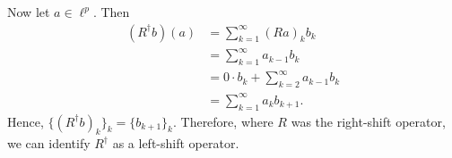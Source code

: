\documentclass{article}
\begin{document}
Now let $a\in\ell^p$. Then 
\begin{align}
	\left(R^{\dagger}b\right)(a) &= \sum_{k=1}^{\infty}\left(Ra\right)_k b_k \\
	&= \sum_{k=1}^{\infty} a_{k-1}b_k \\
	&= 0\cdot b_k + \sum_{k=2}^{\infty}a_{k-1}b_k \\
	&= \sum_{k=1}^{\infty}a_k b_{k+1}. 
\end{align}
Hence, $\{\left(R^{\dagger}b\right)_k\}_k = \{b_{k+1}\}_k$. Therefore, where $R$ was the right-shift operator, we can identify $R^{\dagger}$ as a left-shift operator.
\end{document}
